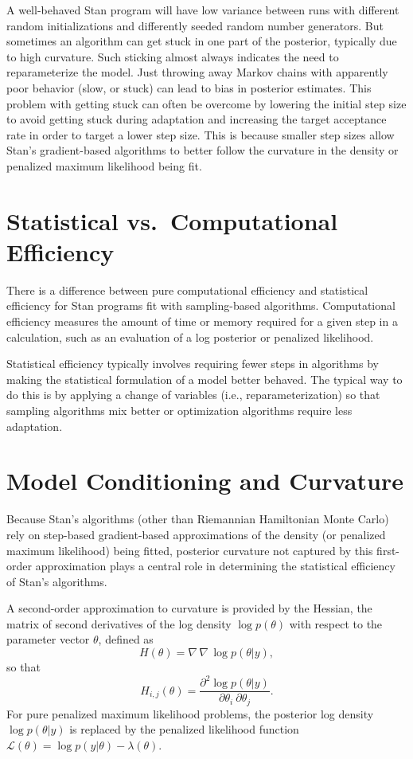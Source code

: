 A well-behaved Stan program will have low variance between runs with
different random initializations and differently seeded random number
generators.  But sometimes an algorithm can get stuck in one part of
the posterior, typically due to high curvature.  Such sticking almost
always indicates the need to reparameterize the model.  Just throwing
away Markov chains with apparently poor behavior (slow, or stuck) can
lead to bias in posterior estimates.  This problem with getting stuck
can often be overcome by lowering the initial step size to avoid
getting stuck during adaptation and increasing the target acceptance
rate in order to target a lower step size.  This is because smaller
step sizes allow Stan's gradient-based algorithms to better follow the
curvature in the density or penalized maximum likelihood being fit.

\section{Statistical vs.\  Computational Efficiency}

There is a difference between pure computational efficiency and
statistical efficiency for Stan programs fit with sampling-based
algorithms.  Computational efficiency measures the amount of time or
memory required for a given step in a calculation, such as an
evaluation of a log posterior or penalized likelihood.

Statistical efficiency typically involves requiring fewer steps in
algorithms by making the statistical formulation of a model better
behaved.  The typical way to do this is by applying a change of
variables (i.e., reparameterization) so that sampling algorithms mix
better or optimization algorithms require less adaptation.

\section{Model Conditioning and Curvature}

Because Stan's algorithms (other than Riemannian Hamiltonian Monte
Carlo) rely on step-based gradient-based approximations of the density
(or penalized maximum likelihood) being fitted, posterior curvature
not captured by this first-order approximation plays a central role in
determining the statistical efficiency of Stan's algorithms.

A second-order approximation to curvature is provided by the
Hessian, the matrix of second derivatives of the log density $\log
p(\theta)$ with respect to the parameter vector $\theta$, defined
as
\[
H(\theta) = \nabla \, \nabla \, \log p(\theta | y),
\]
so that
\[
H_{i, j}(\theta) = \frac{\partial^2 \log p(\theta | y)}
                {\partial \theta_i \ \partial \theta_j}.
\]
For pure penalized maximum likelihood problems, the posterior log
density $\log p(\theta | y)$ is replaced by the penalized likelihood
function $\mathcal{L}(\theta) = \log p(y | \theta) - \lambda(\theta)$.

